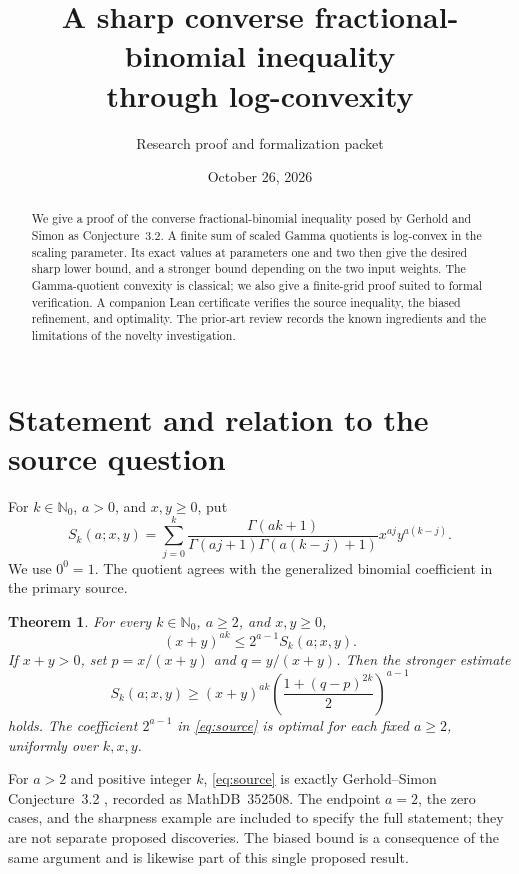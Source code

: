 \documentclass[11pt]{article}
\title{A sharp converse fractional-binomial inequality\\through log-convexity}
\author{Research proof and formalization packet}
\date{October 26, 2026}
\newtheorem{theorem}{Theorem}
\begin{document}
\maketitle
\begin{abstract}
We give a proof of the converse fractional-binomial inequality posed by
Gerhold and Simon as Conjecture~3.2. A finite sum of scaled Gamma quotients
is log-convex in the scaling parameter. Its exact values at parameters
one and two then give the desired sharp lower bound, and a stronger bound
depending on the two input weights. The Gamma-quotient convexity is
classical; we also give a finite-grid proof suited to formal verification.
A companion Lean certificate verifies the source inequality, the biased
refinement, and optimality. The prior-art review records the known
ingredients and the limitations of the novelty investigation.
\end{abstract}

\section{Statement and relation to the source question}
For $k\in\mathbb N_0$, $a>0$, and $x,y\geq0$, put
\[
 S_k(a;x,y)=\sum_{j=0}^k
 \frac{\Gamma(ak+1)}{\Gamma(aj+1)\Gamma(a(k-j)+1)}
 x^{aj}y^{a(k-j)}.
\]
We use $0^0=1$. The quotient agrees with the generalized binomial
coefficient in the primary source.

\begin{theorem}\label{thm:main}
For every $k\in\mathbb N_0$, $a\geq2$, and $x,y\geq0$,
\begin{equation}\label{eq:source}
 (x+y)^{ak}\leq 2^{a-1}S_k(a;x,y).
\end{equation}
If $x+y>0$, set $p=x/(x+y)$ and $q=y/(x+y)$. Then the stronger estimate
\begin{equation}\label{eq:biased}
 S_k(a;x,y)\geq (x+y)^{ak}
 \left(\frac{1+(q-p)^{2k}}{2}\right)^{a-1}
\end{equation}
holds. The coefficient $2^{a-1}$ in \eqref{eq:source} is optimal for each
fixed $a\geq2$, uniformly over $k,x,y$.
\end{theorem}

For $a>2$ and positive integer $k$, \eqref{eq:source} is exactly
Gerhold--Simon Conjecture~3.2 \cite{GS}, recorded as MathDB~352508.
The endpoint $a=2$, the zero cases, and the sharpness example are included
to specify the full statement; they are not separate proposed discoveries.
The biased bound is a consequence of the same argument and is likewise
part of this single proposed result.
\end{document}
